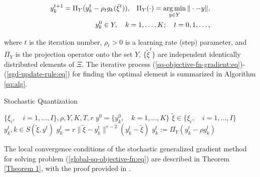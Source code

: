 \begin{eqnarray}
    y^{t+1}_k = \Pi_{Y} (y^t_k - \rho_t g_k(\tilde{\xi}^t)), \;\;\; \Pi_{Y} (\cdot) = \operatorname*{arg\,min}_{y \in Y} \| \cdot - y\|, \label{sgd-update-rule:eq} \\
    y^0_k \in Y, \quad k=1,\ldots,K;\quad t=0,1,\ldots, \label{sgd-update-rule2:eq}
\end{eqnarray}

\noindent where $t$ is the iteration number, $\rho_t > 0$ is a learning rate (step) parameter, and $\Pi_{Y}$ is the projection operator onto the set $Y$, $\{\tilde{\xi}^t\}$ are independent identically distributed elements of $\Xi$. The iterative process (\ref{sq-objective-fn-gradient:eq})-(\ref{sgd-update-rule:eq}) for finding the optimal element is summarized in Algorithm \ref{sq:alg}.

\begin{algorithm}
    \caption{Stochastic Quantization}\label{sq:alg}
    \begin{algorithmic}[1]
        \Require $\{ \xi_i, \quad i = 1, \ldots, I \}, \rho, Y, K, T, r$
        \State $y^0 = \{ y_k^0, \quad k = 1, \ldots, K \}$ 
            \State $\tilde{\xi} \in \{ \xi_i, \quad i = 1, \ldots, I \}$ 
            \State $y_k^t, k \in S(\tilde{\xi}, y^t)$ 
            \State $g_k^t = r \| \tilde{\xi} - y_k^t \|^{r - 2} (y_k^t - \tilde{\xi})$ 
            \State $y_k^t := \Pi_Y (y_k^t - \rho g_k^t)$ 
        \EndFor
    \end{algorithmic}
\end{algorithm}

The local convergence conditions of the stochastic generalized gradient method for solving problem (\ref{global-sq-objective-fn:eq}) are described in Theorem \ref{Theorem 1}, with the proof provided in \cite{Ermoliev_Norkin_2003,Ermolev_Norkin_1998}.

